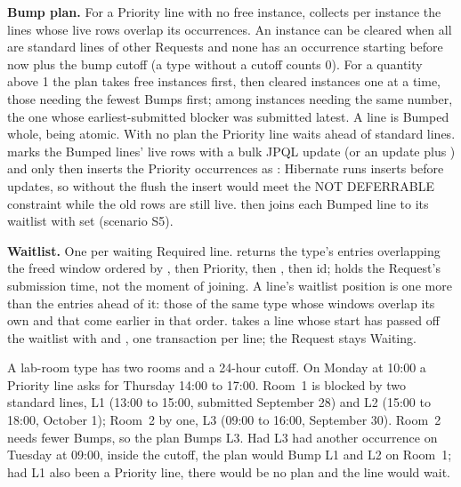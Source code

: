 \textbf{Bump plan.} For a Priority line with no free instance,  collects per instance the lines whose live rows overlap its occurrences. An instance can be cleared when all are standard lines of other Requests and none has an occurrence starting before now plus the bump cutoff (a type without a cutoff counts 0). For a quantity above 1 the plan takes free instances first, then cleared instances one at a time, those needing the fewest Bumps first; among instances needing the same number, the one whose earliest-submitted blocker was submitted latest. A line is Bumped whole, being atomic. With no plan the Priority line waits ahead of standard lines.  marks the Bumped lines' live rows  with a bulk JPQL update (or an update plus ) and only then inserts the Priority occurrences as : Hibernate runs inserts before updates, so without the flush the insert would meet the NOT DEFERRABLE constraint while the old rows are still live.  then joins each Bumped line to its waitlist with  set (scenario S5).

\textbf{Waitlist.} One  per waiting Required line.  returns the type's entries overlapping the freed window ordered by , then Priority, then , then id;  holds the Request's submission time, not the moment of joining. A line's waitlist position is one more than the entries ahead of it: those of the same type whose windows overlap its own and that come earlier in that order.  takes a line whose start has passed off the waitlist with  and , one transaction per line; the Request stays Waiting.

A lab-room type has two rooms and a 24-hour cutoff. On Monday at 10:00 a Priority line asks for Thursday 14:00 to 17:00. Room~1 is blocked by two standard lines, L1 (13:00 to 15:00, submitted September 28) and L2 (15:00 to 18:00, October 1); Room~2 by one, L3 (09:00 to 16:00, September 30). Room~2 needs fewer Bumps, so the plan Bumps L3. Had L3 had another occurrence on Tuesday at 09:00, inside the cutoff, the plan would Bump L1 and L2 on Room~1; had L1 also been a Priority line, there would be no plan and the line would wait.

